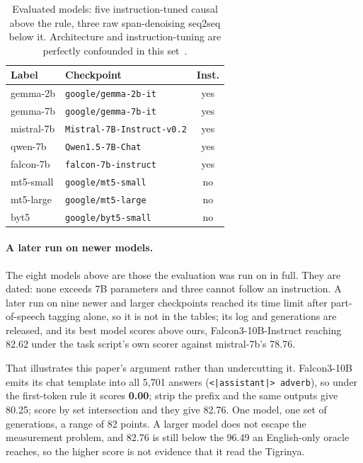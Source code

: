 \documentclass[11pt]{article}
\begin{document}
\begin{table}[tb]
\centering
\small
\setlength{\tabcolsep}{4pt}
\begin{tabular}{@{}llc@{}}
\toprule
Label & Checkpoint & Inst. \\
\midrule
gemma-2b    & \texttt{google/gemma-2b-it}        & yes \\
gemma-7b    & \texttt{google/gemma-7b-it}        & yes \\
mistral-7b  & \texttt{Mistral-7B-Instruct-v0.2}  & yes \\
qwen-7b     & \texttt{Qwen1.5-7B-Chat}           & yes \\
falcon-7b   & \texttt{falcon-7b-instruct}        & yes \\
\midrule
mt5-small   & \texttt{google/mt5-small}          & no  \\
mt5-large   & \texttt{google/mt5-large}          & no  \\
byt5        & \texttt{google/byt5-small}         & no  \\
\bottomrule
\end{tabular}
\caption{Evaluated models: five instruction-tuned causal above the rule,
three raw span-denoising seq2seq below it. Architecture and
instruction-tuning are perfectly confounded in this
set~\citep{gemma-2024,jiang-etal-2023-mistral,bai-etal-2023-qwen,almazrouei-etal-2023-falcon,xue-etal-2021-mt5,xue-etal-2022-byt5}.}
\label{tab:models}
\end{table}

\paragraph{A later run on newer models.} The eight models above are those
the evaluation was run on in full. They are dated: none exceeds 7B
parameters and three cannot follow an instruction. A later run on nine newer
and larger checkpoints reached its time limit after part-of-speech tagging
alone, so it is not in the tables; its log and generations are released, and
its best model scores above ours, Falcon3-10B-Instruct reaching 82.62 under
the task script's own scorer against mistral-7b's 78.76.

That illustrates this paper's argument rather than undercutting it.
Falcon3-10B emits its chat template into all 5,701 answers
(\texttt{<|assistant|> adverb}), so under the first-token rule it scores
\textbf{0.00}; strip the prefix and the same outputs give 80.25; score by
set intersection and they give 82.76. One model, one set of generations, a
range of 82 points. A larger model does not escape the measurement problem,
and 82.76 is still below the 96.49 an English-only oracle reaches, so the
higher score is not evidence that it read the Tigrinya.
\end{document}
